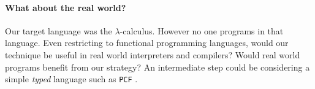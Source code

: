 \paragraph{What about the real world?} Our target language was the $\lambda$-calculus. However no one programs in that language. Even restricting to functional programming languages, would our technique be useful in real world interpreters and compilers? Would real world programs benefit from our strategy? An intermediate step could be considering a simple \emph{typed} language such as \texttt{PCF} \cite{plotkin_lcf_1977}. 